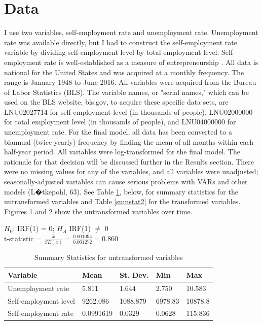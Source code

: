 \documentclass[]{ecca}
\begin{document}
\section{Data}

I use two variables, self-employment rate and unemployment rate. Unemployment rate was available directly, but I had to construct the self-employment rate variable by dividing self-employment level by total employment level. Self-employment rate is well-established as a measure of entrepreneurship \citep{matejovsky14}. All data is national for the United States and was acquired at a monthly frequency. The range is January 1948 to June 2016. All variables were acquired from the Bureau of Labor Statistics (BLS). The variable names, or "serial names," which can be used on the BLS website, bls.gov, to acquire these specific data sets, are LNU02027714 for self-employment level (in thousands of people), LNU02000000 for total employment level (in thousands of people), and LNU04000000 for unemployment rate. For the final model, all data has been converted to a biannual (twice yearly) frequency by finding the mean of all months within each half-year period. All variables were log-transformed for the final model. The rationale for that decision will be discussed further in the Results section. There were no missing values for any of the variables, and all variables were unadjusted; seasonally-adjusted variables can cause serious problems with VARs and other models (L�tkepohl, 63). See Table \ref{sumstat1}, below, for summary statistics for the untransformed variables and Table \ref{sumstat2} for the transformed variables. Figures 1 and 2 show the untransformed variables over time.

\begin{center}
	$H_0$: IRF(1) = 0;  $H_A$ IRF(1) $\neq$ 0 \\
	t-statistic = $\frac{\hat{x}}{SE(x)} =\frac{0.001094}{0.001272}=0.860$ \\ 
\end{center}


\begin{table}[!h]
	\centering
	\caption{Summary Statistics for untransformed variables}
	\label{sumstat1}
	\begin{tabular}{lllll}
		\hline 
		Variable	& Mean &	St. Dev. & Min & Max \\
		\hline
		Unemployment rate & 5.811	&	1.644 &	2.750 & 10.583  \\
		Self-employment level &	9262.086	& 1088.879 &	6978.83	& 10878.8 \\
		Self-employment  rate & 0.0991619 &	0.0329 &	0.0628	& 115.836  \\
		\hline 
	\end{tabular}
\end{table}
\end{document}
